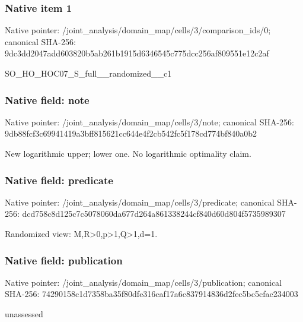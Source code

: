 \documentclass[10pt,a4paper]{article}
\begin{document}
\subsubsection{Native item 1}
Native pointer: /joint\_\allowbreak{}analysis/domain\_\allowbreak{}map/cells/3/comparison\_\allowbreak{}ids/0; canonical SHA-256: 9dc3dd2047add603820b5ab261b1915d6346545c775dcc256af809551e12c2af

\begingroup\raggedright\sloppy SO\_\allowbreak{}HO\_\allowbreak{}HOC07\_\allowbreak{}S\_\allowbreak{}full\_\allowbreak{}\_\allowbreak{}randomized\_\allowbreak{}\_\allowbreak{}c1\par\endgroup

\subsubsection{Native field: note}
Native pointer: /joint\_\allowbreak{}analysis/domain\_\allowbreak{}map/cells/3/note; canonical SHA-256: 9db88fcf3c69941419a3bff815621cc644e4f2cb542fc5f178cd774bf840a0b2

\begingroup\raggedright\sloppy New logarithmic upper;\allowbreak{} lower one. No logarithmic optimality claim.\par\endgroup

\subsubsection{Native field: predicate}
Native pointer: /joint\_\allowbreak{}analysis/domain\_\allowbreak{}map/cells/3/predicate; canonical SHA-256: dcd758c8d125c7c5078060da677d264a861338244cf840d60d804f5735989307

\begingroup\raggedright\sloppy Randomized view:\allowbreak{} M,\allowbreak{}R>0,\allowbreak{}p>1,\allowbreak{}Q>1,\allowbreak{}d=\allowbreak{}1.\par\endgroup

\subsubsection{Native field: publication}
Native pointer: /joint\_\allowbreak{}analysis/domain\_\allowbreak{}map/cells/3/publication; canonical SHA-256: 74290158c1d7358ba35f80dfe316caf17a6c837914836d2fec5bc5cfac234003

\begingroup\raggedright\sloppy unassessed\par\endgroup
\end{document}
